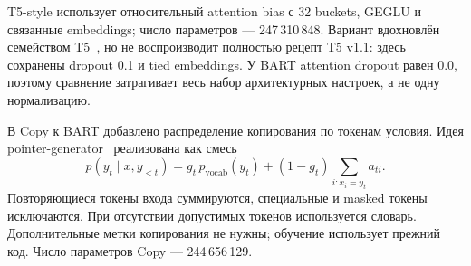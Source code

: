 T5-style использует относительный attention bias с 32 buckets,
GEGLU и связанные embeddings; число параметров --- 247\,310\,848.
Вариант вдохновлён семейством T5~\cite{t5}, но не воспроизводит полностью
рецепт T5 v1.1: здесь сохранены dropout 0.1 и tied embeddings.
У BART attention dropout равен 0.0, поэтому сравнение затрагивает
весь набор архитектурных настроек, а не одну нормализацию.

В Copy к BART добавлено распределение копирования по токенам условия.
Идея pointer-generator~\cite{pointer} реализована как смесь
\[
 p(y_t\mid x,y_{<t})=g_t\,p_{\mathrm{vocab}}(y_t)
 +(1-g_t)\sum_{i:x_i=y_t}a_{ti}.
\]
Повторяющиеся токены входа суммируются, специальные и masked токены
исключаются. При отсутствии допустимых токенов используется словарь.
Дополнительные метки копирования не нужны; обучение использует прежний код.
Число параметров Copy --- 244\,656\,129.

